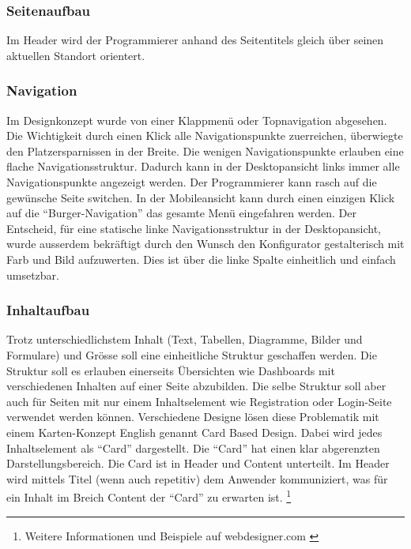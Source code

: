 \subsubsection{Seitenaufbau}\label{seitenaufbau}

Im Header wird der Programmierer anhand des Seitentitels gleich über
seinen aktuellen Standort orientert.

\subsubsection{Navigation}\label{navigation}

Im Designkonzept wurde von einer Klappmenü oder Topnavigation abgesehen.
Die Wichtigkeit durch einen Klick alle Navigationspunkte zuerreichen,
überwiegte den Platzersparnissen in der Breite. Die wenigen
Navigationspunkte erlauben eine flache Navigationsstruktur. Dadurch kann
in der Desktopansicht links immer alle Navigationspunkte angezeigt
werden. Der Programmierer kann rasch auf die gewünsche Seite switchen.
In der Mobileansicht kann durch einen einzigen Klick auf die
``Burger-Navigation'' das gesamte Menü eingefahren werden. Der
Entscheid, für eine statische linke Navigationsstruktur in der
Desktopansicht, wurde ausserdem bekräftigt durch den Wunsch den
Konfigurator gestalterisch mit Farb und Bild aufzuwerten. Dies ist über
die linke Spalte einheitlich und einfach umsetzbar.

\subsubsection{Inhaltaufbau}\label{inhaltaufbau}

Trotz unterschiedlichstem Inhalt (Text, Tabellen, Diagramme, Bilder und
Formulare) und Grösse soll eine einheitliche Struktur geschaffen werden.
Die Struktur soll es erlauben einerseits Übersichten wie Dashboards mit
verschiedenen Inhalten auf einer Seite abzubilden. Die selbe Struktur
soll aber auch für Seiten mit nur einem Inhaltselement wie Registration
oder Login-Seite verwendet werden können. Verschiedene Designe lösen
diese Problematik mit einem Karten-Konzept English genannt Card Based
Design. Dabei wird jedes Inhaltselement als ``Card'' dargestellt. Die
``Card'' hat einen klar abgerenzten Darstellungsbereich. Die Card ist in
Header und Content unterteilt. Im Header wird mittels Titel (wenn auch
repetitiv) dem Anwender kommuniziert, was für ein Inhalt im Breich
Content der ``Card'' zu erwarten ist. \footnote{Weitere Informationen
  und Beispiele auf webdesigner.com \autocite{card-based-design}}


